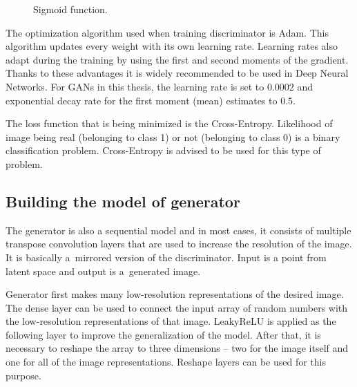 \begin{figure}[!h]
    \centering
    \caption{\label{fig:sigmoid}Sigmoid function.}
\end{figure}

The optimization algorithm used when training discriminator is Adam. This algorithm updates every weight with its own learning rate. Learning rates also adapt during the training by using the first and second moments of the gradient. Thanks to these advantages it is widely recommended to be used in Deep Neural Networks. For GANs in this thesis, the learning rate is set to $0.0002$ and exponential decay rate for the first moment (mean) estimates to $0.5$.

The loss function that is being minimized is the Cross-Entropy. Likelihood of image being real (belonging to class 1) or not (belonging to class 0) is a binary classification problem. Cross-Entropy is advised to be used for this type of problem.

\subsection*{Building the model of generator}
The generator is also a sequential model and in most cases, it consists of multiple transpose convolution layers that are used to increase the resolution of the image. It is basically a~mirrored version of the discriminator. Input is a point from latent space and output is a~generated image.

Generator first makes many low-resolution representations of the desired image. The dense layer can be used to connect the input array of random numbers with the low-resolution representations of that image. LeakyReLU is applied as the following layer to improve the generalization of the model. After that, it is necessary to reshape the array to three dimensions -- two for the image itself and one for all of the image representations. Reshape layers can be used for this purpose.

